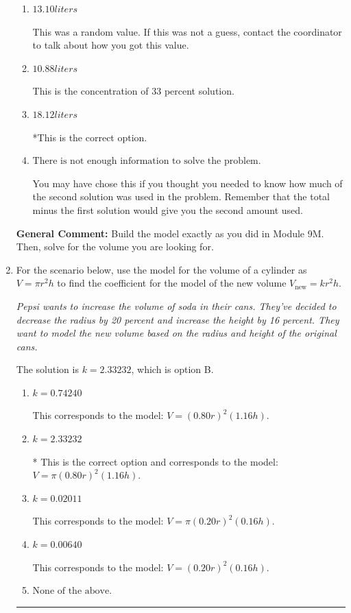 \documentclass{extbook}[14pt]
\newcommand{\litem}[1]{\item #1

\rule{\textwidth}{0.4pt}}
\begin{document}
\begin{enumerate}
{\begin{enumerate}[label=\Alph*.]
This would be correct if Brittany used equal parts of each solution.
\item \( 13.10 liters \)

This was a random value. If this was not a guess, contact the coordinator to talk about how you got this value.
\item \( 10.88 liters \)

This is the concentration of 33 percent solution.
\item \( 18.12 liters \)

*This is the correct option.
\item \( \text{There is not enough information to solve the problem.} \)

You may have chose this if you thought you needed to know how much of the second solution was used in the problem. Remember that the total minus the first solution would give you the second amount used.
\end{enumerate}

\textbf{General Comment:} Build the model exactly as you did in Module 9M. Then, solve for the volume you are looking for.
}
\litem{
For the scenario below, use the model for the volume of a cylinder as $V = \pi r^2 h$ to find the coefficient for the model of the new volume $V_{\text{new}} = k r^2 h$.

\begin{center}
    \textit{ Pepsi wants to increase the volume of soda in their cans. They've decided to decrease the radius by 20 percent and increase the height by 16 percent. They want to model the new volume based on the radius and height of the original cans. }
\end{center}
The solution is \( k = 2.33232 \), which is option B.\begin{enumerate}[label=\Alph*.]
\item \( k = 0.74240 \)

This corresponds to the model: $V = (0.80 r)^2 (1.16 h)$.
\item \( k = 2.33232 \)

* This is the correct option and corresponds to the model: $V = \pi (0.80 r)^2 (1.16 h)$.
\item \( k = 0.02011 \)

This corresponds to the model: $V = \pi (0.20 r)^2 (0.16 h)$.
\item \( k = 0.00640 \)

This corresponds to the model: $V = (0.20 r)^2 (0.16 h)$.
\item \( \text{None of the above.} \)


\end{enumerate}}
\end{enumerate}
\end{document}
